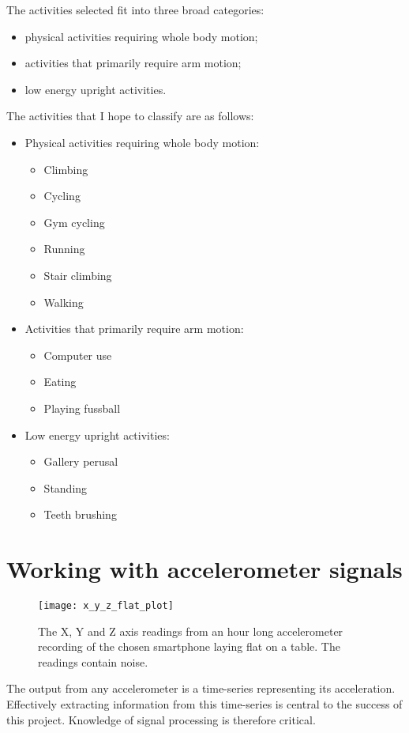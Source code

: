     The activities selected fit into three broad categories:
    \begin{itemize}
      \item physical activities requiring whole body motion;
      \item activities that primarily require arm motion;
      \item low energy upright activities.
    \end{itemize}
    
    The activities that I hope to classify are as follows:
    \begin{itemize}
      \item Physical activities requiring whole body motion:
      \begin{itemize}
        \item Climbing
        \item Cycling
        \item Gym cycling
        \item Running
        \item Stair climbing
        \item Walking
      \end{itemize} 
      \item Activities that primarily require arm motion:
      \begin{itemize}
        \item Computer use
        \item Eating
        \item Playing fussball
      \end{itemize}
      \item Low energy upright activities:
      \begin{itemize}
        \item Gallery perusal
        \item Standing
        \item Teeth brushing
      \end{itemize}
    \end{itemize}
  
  \section{Working with accelerometer signals}
    \label{sec:intro-sig-processing}

    
    \begin{figure}
      \centering
      \texttt{[image: x\_y\_z\_flat\_plot]}
      \caption[Noisy readings of the X, Y and Z axes]{The X, Y and Z axis readings from an hour long accelerometer recording of the chosen smartphone laying flat on a table. The readings contain noise.}
      \label{fig:x_y_z_flat_plot}
    \end{figure}
    The output from any accelerometer is a time-series representing its acceleration. Effectively extracting information from this time-series is central to the success of this project. Knowledge of signal processing is therefore critical.
    
